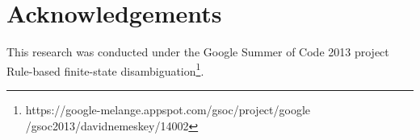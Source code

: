 \documentclass{article}
\begin{document}
\section*{Acknowledgements}
This research was conducted under the Google Summer of Code 2013 project
Rule-based finite-state disambiguation\footnote{https://google-melange.appspot.com/gsoc/project/google
/gsoc2013/davidnemeskey/14002}.

\cite{Karlsson:1990} %
\cite{Hulden:2011} %
\cite{Peltonen:2011} %
\cite{Tapanainen:1996} %



\end{document}
